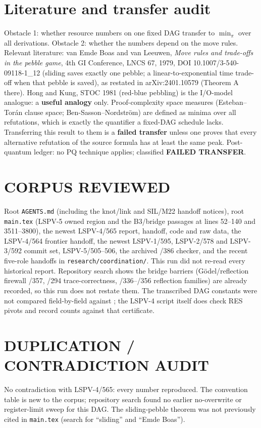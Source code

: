 \documentclass[11pt]{article}
\begin{document}
\section{Literature and transfer audit}
Obstacle 1: whether resource numbers on one fixed DAG transfer to $\min_\pi$ over all derivations.  Obstacle 2: whether the numbers depend on the move rules.  Relevant literature: van Emde Boas and van Leeuwen, \emph{Move rules and trade-offs in the pebble game}, 4th GI Conference, LNCS 67, 1979, DOI 10.1007/3-540-09118-1\_12 (sliding saves exactly one pebble; a linear-to-exponential time trade-off when that pebble is saved), as restated in arXiv:2401.10579 (Theorem A there).  Hong and Kung, STOC 1981 (red-blue pebbling) is the I/O-model analogue: a \textbf{useful analogy} only.  Proof-complexity space measures (Esteban--Tor\'an clause space; Ben-Sasson--Nordstr\"om) are defined as minima over all refutations, which is exactly the quantifier a fixed-DAG schedule lacks.  Transferring this result to them is a \textbf{failed transfer} unless one proves that every alternative refutation of the source formula has at least the same peak.  Post-quantum ledger: no PQ technique applies; classified \textbf{FAILED TRANSFER}.

\section{CORPUS REVIEWED}
Root \texttt{AGENTS.md} (including the knot/link and SIL/M22 handoff notices), root \texttt{main.tex} (LSPV-5 owned region and the B3/bridge passages at lines 52--140 and 3511--3800), the newest LSPV-4/565 report, handoff, code and raw data, the LSPV-4/564 frontier handoff, the newest LSPV-1/595, LSPV-2/578 and LSPV-3/592 commit set, LSPV-5/505--506, the archived /386 checker, and the recent five-role handoffs in \texttt{research/coordination/}.  This run did not re-read every historical report.  Repository search shows the bridge barriers (Gödel/reflection firewall /357, /294 trace-correctness, /336--/356 reflection families) are already recorded, so this run does not restate them.  The transcribed DAG constants were not compared field-by-field against ; the LSPV-4 script itself does check RES pivots and record counts against that certificate.

\section{DUPLICATION / CONTRADICTION AUDIT}
No contradiction with LSPV-4/565: every number reproduced.  The convention table is new to the corpus; repository search found no earlier no-overwrite or register-limit sweep for this DAG.  The sliding-pebble theorem was not previously cited in \texttt{main.tex} (search for ``sliding'' and ``Emde Boas'').
\end{document}
